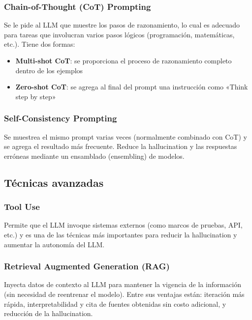 \subsubsection{Chain-of-Thought (CoT) Prompting}

Se le pide al LLM que muestre los pasos de razonamiento, lo cual es adecuado para tareas que involucran varios pasos lógicos (programación, matemáticas, etc.). Tiene dos formas:
\begin{itemize}
    \item \textbf{Multi-shot CoT}: se proporciona el proceso de razonamiento completo dentro de los ejemplos
    \item \textbf{Zero-shot CoT}: se agrega al final del prompt una instrucción como «Think step by step»
\end{itemize}

\subsubsection{Self-Consistency Prompting}

Se muestrea el mismo prompt varias veces (normalmente combinado con CoT) y se agrega el resultado más frecuente. Reduce la hallucination y las respuestas erróneas mediante un ensamblado (ensembling) de modelos.

\subsection{Técnicas avanzadas}

\subsubsection{Tool Use}

Permite que el LLM invoque sistemas externos (como marcos de pruebas, API, etc.) y es una de las técnicas más importantes para reducir la hallucination y aumentar la autonomía del LLM.

\subsubsection{Retrieval Augmented Generation (RAG)}

Inyecta datos de contexto al LLM para mantener la vigencia de la información (sin necesidad de reentrenar el modelo). Entre sus ventajas están: iteración más rápida, interpretabilidad y cita de fuentes obtenidas sin costo adicional, y reducción de la hallucination.

